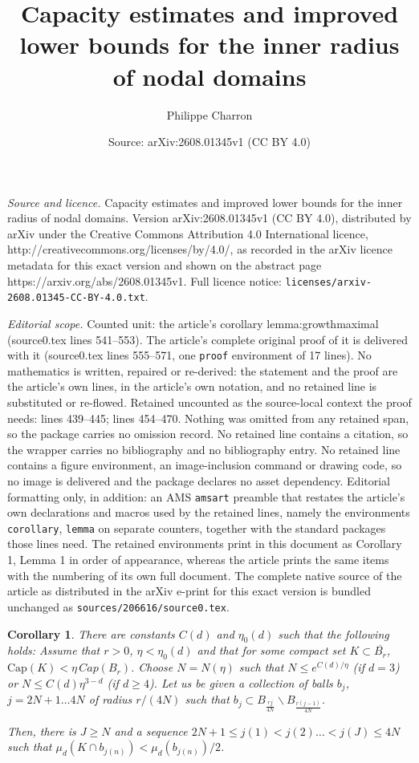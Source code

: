 \documentclass[10pt,a4paper]{amsart}
\title{Capacity estimates and improved lower bounds for the inner radius of nodal domains}
\author{Philippe Charron}
\date{Source: arXiv:2608.01345v1 (CC BY 4.0)}
\newtheorem{corollary}{Corollary}
\begin{document}
\maketitle

\noindent\emph{Source and licence.} Capacity estimates and improved lower bounds for the inner radius of nodal domains. Version arXiv:2608.01345v1 (CC BY 4.0), distributed by arXiv under the Creative Commons Attribution 4.0 International licence, http://creativecommons.org/licenses/by/4.0/, as recorded in the arXiv licence metadata for this exact version and shown on the abstract page https://arxiv.org/abs/2608.01345v1. Full licence notice: \texttt{licenses/arxiv-2608.01345-CC-BY-4.0.txt}.\par\smallskip

\noindent\textit{Editorial scope.} Counted unit: the article's corollary lemma:growthmaximal (source0.tex lines 541--553). The article's complete original proof of it is delivered with it (source0.tex lines 555--571, one \texttt{proof} environment of 17 lines). No mathematics is written, repaired or re-derived: the statement and the proof are the article's own lines, in the article's own notation, and no retained line is substituted or re-flowed.  Retained uncounted as the source-local context the proof needs: lines 439--445; lines 454--470.  Nothing was omitted from any retained span, so the package carries no omission record.  No retained line contains a citation, so the wrapper carries no bibliography and no bibliography entry.  No retained line contains a figure environment, an image-inclusion command or drawing code, so no image is delivered and the package declares no asset dependency.  Editorial formatting only, in addition: an AMS \texttt{amsart} preamble that restates the article's own declarations and macros used by the retained lines, namely the environments \texttt{corollary}, \texttt{lemma} on separate counters, together with the standard packages those lines need.  The retained environments print in this document as Corollary 1, Lemma 1 in order of appearance, whereas the article prints the same items with the numbering of its own full document.  The complete native source of the article as distributed in the arXiv e-print for this exact version is bundled unchanged as \texttt{sources/206616/source0.tex}.
\begin{corollary}\label{cor:totalcapacityonannuli}
There are constants $C(d)$ and $\eta_0(d)$ such that the following holds:
    Assume that $r>0$, $\eta < \eta_0(d)$ and that for some compact set $K \subset \overline{B_r}$, $\text{Cap}(K) < \eta \, Cap(B_r)$. Choose $N=N(\eta)$ such that $N \leq e^{C(d)/\eta}$ (if $d=3$) or $N \leq C(d)\eta^{3-d}$ (if $d \geq 4$). Let us be given a collection of balls $b_j$, $j=2N+1 \ldots 4N$ of radius $r/(4N)$ such that $b_j \subset B_{\frac{rj}{4N}} \backslash B_{\frac{r(j-1)}{4N}}$.
    
    Then, there is $J \geq N$ and a sequence $2N+1 \leq j(1) < j(2) \ldots < j(J) \leq 4N$ such that \linebreak $\mu_d\left( K \cap b_{j(n)}\right) <  \mu_d(b_{j(n)})/2$.
    
\end{corollary}
\end{document}
